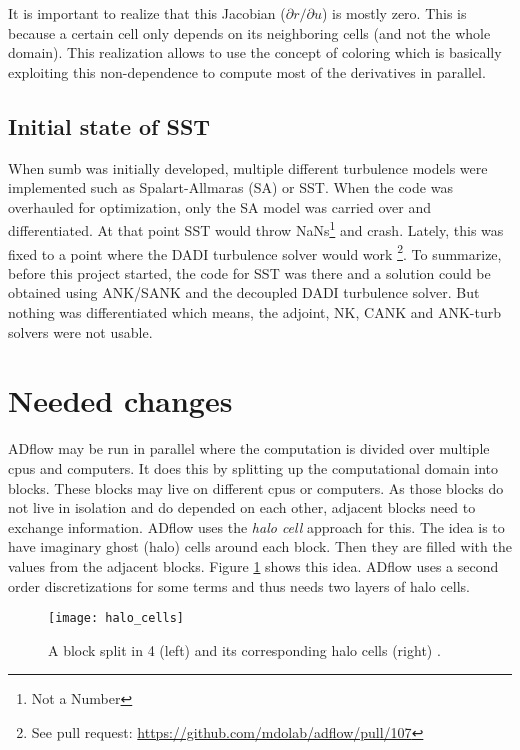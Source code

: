 It is important to realize that this Jacobian ($\partial r / \partial u$) is
mostly zero. This is because a certain cell only depends on its neighboring
cells (and not the whole domain). This realization allows to use the concept of
coloring which is basically exploiting this non-dependence to compute most of
the derivatives in parallel. \cite{mdobook}




\subsection{Initial state of SST}
When sumb was initially developed, multiple different turbulence models
were implemented such as Spalart-Allmaras (SA) or SST. When the code was
overhauled for optimization, only the SA model was carried over and
differentiated. At that point SST would throw NaNs\footnote{Not a Number} and
crash. Lately, this was fixed to a point where the DADI turbulence solver would
work \footnote{See pull request:
\url{https://github.com/mdolab/adflow/pull/107}}. To summarize, before this
project started, the code for SST was there and a solution could be obtained
using ANK/SANK and the decoupled DADI turbulence solver. But nothing was
differentiated which means, the adjoint, NK, CANK and ANK-turb solvers were not
usable.








\section{Needed changes}
ADflow may be run in parallel where the computation is divided over multiple
cpus and computers. It does this by splitting up the computational domain into
blocks. These blocks may live on different cpus or computers. As those blocks
do not live in isolation and do depended on each other, adjacent blocks need to
exchange information. ADflow uses the \textit{halo cell} approach for this. The
idea is to have imaginary ghost (halo) cells around each block. Then they are
filled with the values from the adjacent blocks. Figure \ref{fig:halo_cells}
shows this idea. ADflow uses a second order discretizations for some terms and
thus needs two layers of halo cells.

\begin{figure}[H] \centering
\texttt{[image: halo\_cells]}
    \caption{A block split in 4 (left) and its corresponding halo cells (right)
            \cite{cfd_halo}.}
    \label{fig:halo_cells}
\end{figure}




